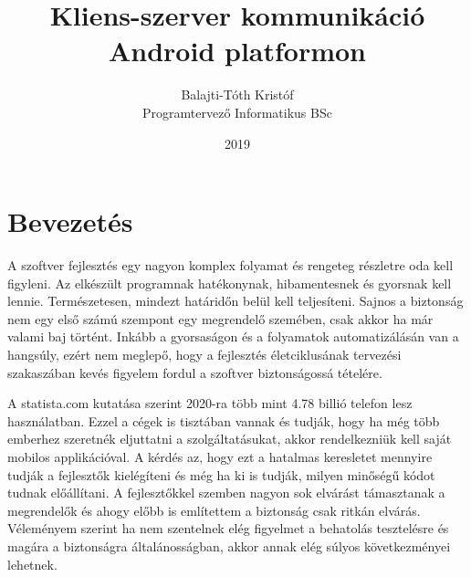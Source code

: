 \documentclass{thesis-ekf}
\theoremstyle{definition}
\theoremstyle{remark}
\begin{document}
\title{Kliens-szerver kommunikáció\\Android platformon}
\author{Balajti-Tóth Kristóf\\Programtervező Informatikus BSc}
\date{2019}
\maketitle
\tableofcontents
\listoffigures
\renewcommand\listoflistingscaption{Forráskódok jegyzéke}
\listoflistings

\chapter*{Bevezetés}

A szoftver fejlesztés egy nagyon komplex folyamat és rengeteg részletre oda kell figyleni.
Az elkészült programnak hatékonynak, hibamentesnek és gyorsnak kell lennie. Természetesen, mindezt határidőn belül kell teljesíteni.
Sajnos a biztonság nem egy első számú szempont egy megrendelő szemében, csak akkor ha már valami baj történt.
Inkább a gyorsaságon és a folyamatok automatizálásán van a hangsúly, ezért nem  meglepő, hogy a fejlesztés életciklusának tervezési szakaszában kevés figyelem fordul a szoftver biztonságossá tételére.

A statista.com \cite{statista} kutatása szerint 2020-ra több mint 4.78 billió telefon lesz használatban.
Ezzel a cégek is tisztában vannak és tudják, hogy ha még több emberhez szeretnék eljuttatni a szolgáltatásukat, akkor rendelkezniük kell saját mobilos applikációval.
A kérdés az, hogy ezt a hatalmas keresletet mennyire tudják a fejlesztők kielégíteni és még ha ki is tudják, milyen minőségű kódot tudnak előállítani.
A fejlesztőkkel szemben nagyon sok elvárást támasztanak a megrendelők és ahogy előbb is említettem a biztonság csak ritkán elvárás.
Véleményem szerint ha nem szentelnek elég figyelmet a behatolás tesztelésre és magára a biztonságra általánosságban, akkor annak elég súlyos következményei lehetnek.
\end{document}
